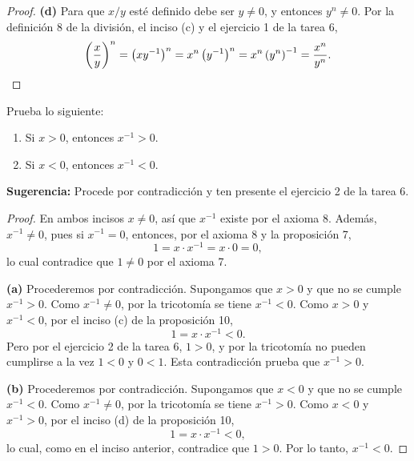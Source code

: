 \documentclass[12pt,a4paper]{article}
\begin{document}
\begin{proof}
        \textbf{(d)} Para que $x/y$ esté definido debe ser $y\neq0$, y entonces $y^{n}\neq0$. Por la definición 8 de la división, el inciso (c) y el ejercicio 1 de la tarea 6,
        \begin{equation*}
            \left(\frac{x}{y}\right)^{n}=\left(xy^{-1}\right)^{n}=x^{n}\left(y^{-1}\right)^{n}=x^{n}\left(y^{n}\right)^{-1}=\frac{x^{n}}{y^{n}}.\qedhere
        \end{equation*}
    \end{proof}

    \begin{problema}
        Prueba lo siguiente:
        \begin{enumerate}
            \item[(a)] Si $x>0$, entonces $x^{-1}>0$.
            \item[(b)] Si $x<0$, entonces $x^{-1}<0$.
        \end{enumerate}
        \textbf{Sugerencia:} Procede por contradicción y ten presente el ejercicio 2 de la tarea 6.
    \end{problema}

    \begin{proof}
        En ambos incisos $x\neq0$, así que $x^{-1}$ existe por el axioma 8. Además, $x^{-1}\neq0$, pues si $x^{-1}=0$, entonces, por el axioma 8 y la proposición 7,
        \begin{equation*}
            1=x\cdot x^{-1}=x\cdot0=0,
        \end{equation*}
        lo cual contradice que $1\neq0$ por el axioma 7.

        \textbf{(a)} Procederemos por contradicción. Supongamos que $x>0$ y que no se cumple $x^{-1}>0$. Como $x^{-1}\neq0$, por la tricotomía se tiene $x^{-1}<0$. Como $x>0$ y $x^{-1}<0$, por el inciso (c) de la proposición 10,
        \begin{equation*}
            1=x\cdot x^{-1}<0.
        \end{equation*}
        Pero por el ejercicio 2 de la tarea 6, $1>0$, y por la tricotomía no pueden cumplirse a la vez $1<0$ y $0<1$. Esta contradicción prueba que $x^{-1}>0$.

        \textbf{(b)} Procederemos por contradicción. Supongamos que $x<0$ y que no se cumple $x^{-1}<0$. Como $x^{-1}\neq0$, por la tricotomía se tiene $x^{-1}>0$. Como $x<0$ y $x^{-1}>0$, por el inciso (d) de la proposición 10,
        \begin{equation*}
            1=x\cdot x^{-1}<0,
        \end{equation*}
        lo cual, como en el inciso anterior, contradice que $1>0$. Por lo tanto, $x^{-1}<0$.
    \end{proof}
\end{document}
